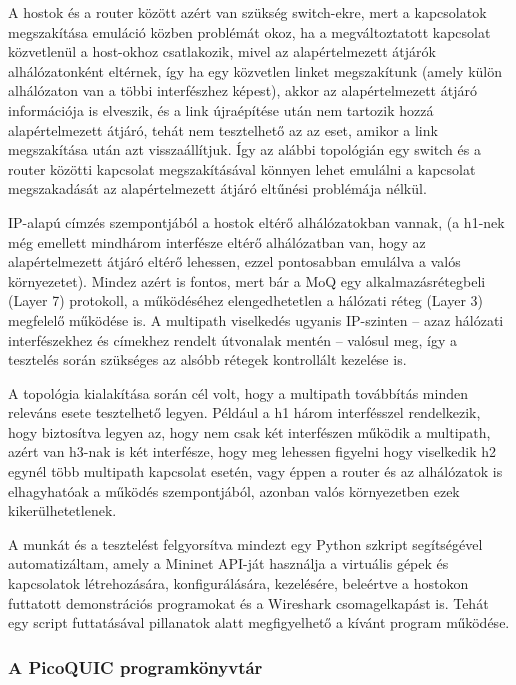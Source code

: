 \documentclass[a4paper,oneside]{article}
\begin{document}
A hostok és a router között azért van szükség switch-ekre,
mert a kapcsolatok megszakítása emuláció közben problémát okoz, ha a megváltoztatott kapcsolat közvetlenül a host-okhoz csatlakozik, 
mivel az alapértelmezett átjárók alhálózatonként eltérnek, így ha egy közvetlen linket megszakítunk (amely külön alhálózaton van a többi interfészhez képest), 
akkor az alapértelmezett átjáró információja is elveszik, és a link újraépítése után nem tartozik hozzá alapértelmezett átjáró, tehát nem tesztelhető 
az az eset, amikor a link megszakítása után azt visszaállítjuk.
Így az alábbi topológián egy switch és a router közötti kapcsolat megszakításával könnyen lehet emulálni a kapcsolat 
megszakadását az alapértelmezett átjáró eltűnési problémája nélkül.

IP-alapú címzés szempontjából a hostok eltérő alhálózatokban vannak, (a h1-nek még emellett 
mindhárom interfésze eltérő alhálózatban van, hogy az alapértelmezett átjáró eltérő lehessen, ezzel pontosabban emulálva a valós környezetet).
Mindez azért is fontos, mert bár a MoQ egy alkalmazásrétegbeli (Layer 7) protokoll, a 
működéséhez elengedhetetlen a hálózati réteg (Layer 3) megfelelő működése is. A multipath viselkedés 
ugyanis IP-szinten – azaz hálózati interfészekhez és címekhez rendelt útvonalak mentén – valósul meg, 
így a tesztelés során szükséges az alsóbb rétegek kontrollált kezelése is.

A topológia kialakítása során cél volt, hogy a multipath továbbítás minden releváns esete tesztelhető legyen.
Például a h1 három interfésszel rendelkezik, hogy biztosítva legyen az, hogy nem csak két interfészen működik a multipath, azért van h3-nak is két interfésze, 
hogy meg lehessen figyelni hogy viselkedik h2 egynél több multipath kapcsolat esetén, 
vagy éppen a router és az alhálózatok is elhagyhatóak a működés szempontjából, azonban valós környezetben ezek kikerülhetetlenek. 

A munkát és a tesztelést felgyorsítva mindezt egy Python szkript segítségével automatizáltam, 
amely a Mininet API-ját használja a virtuális gépek és kapcsolatok létrehozására, konfigurálására, kezelésére, beleértve
a hostokon futtatott demonstrációs programokat és a Wireshark csomagelkapást is.
Tehát egy script futtatásával pillanatok alatt megfigyelhető a kívánt program működése.

\subsubsection{A PicoQUIC programkönyvtár}
\end{document}
